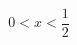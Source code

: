 \documentclass[preview]{standalone}
\begin{document}
\begin{align*}
0 < x < \dfrac{1}{2}
\end{align*}
\end{document}

